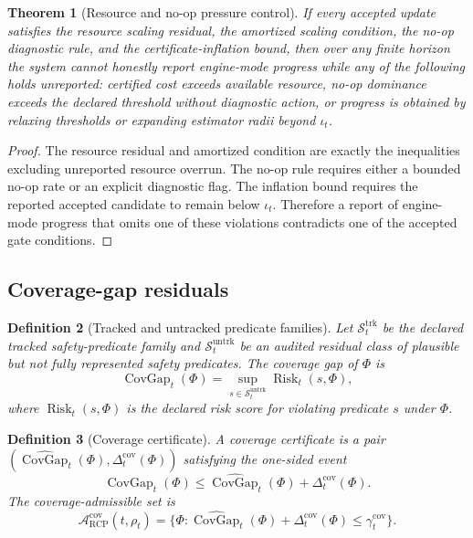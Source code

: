 \documentclass[11pt]{article}
\newtheorem{theorem}{Theorem}[section]
\newtheorem{definition}[theorem]{Definition}
\newcommand{\Acal}{\mathcal{A}}
\newcommand{\1}{\mathbf{1}}
\newcommand{\RCP}{\mathrm{RCP}}
\newcommand{\Risk}{\operatorname{Risk}}
\providecommand{\Scal}{\mathcal{S}}
\begin{document}
\begin{theorem}[Resource and no-op pressure control]
\label{thm:resource_noop_pressure_control_operational}
If every accepted update satisfies the resource scaling residual, the amortized scaling condition, the no-op diagnostic rule, and the certificate-inflation bound, then over any finite horizon the system cannot honestly report engine-mode progress while any of the following holds unreported: certified cost exceeds available resource, no-op dominance exceeds the declared threshold without diagnostic action, or progress is obtained by relaxing thresholds or expanding estimator radii beyond \(\iota_t\).
\end{theorem}

\begin{proof}
The resource residual and amortized condition are exactly the inequalities excluding unreported resource overrun.  The no-op rule requires either a bounded no-op rate or an explicit diagnostic flag.  The inflation bound requires the reported accepted candidate to remain below \(\iota_t\).  Therefore a report of engine-mode progress that omits one of these violations contradicts one of the accepted gate conditions.
\end{proof}

\subsection{Coverage-gap residuals}

\begin{definition}[Tracked and untracked predicate families]
\label{def:tracked_untracked_predicate_families}
Let \(\Scal_t^{\mathrm{trk}}\) be the declared tracked safety-predicate family and \(\Scal_t^{\mathrm{untrk}}\) be an audited residual class of plausible but not fully represented safety predicates.  The coverage gap of \(\Phi\) is
\[
\operatorname{CovGap}_t(\Phi)
=
\sup_{s\in\Scal_t^{\mathrm{untrk}}}\Risk_t(s,\Phi),
\]
where \(\Risk_t(s,\Phi)\) is the declared risk score for violating predicate \(s\) under \(\Phi\).
\end{definition}

\begin{definition}[Coverage certificate]
\label{def:coverage_certificate_operational}
A coverage certificate is a pair \((\widehat{\operatorname{CovGap}}_t(\Phi),\Delta_t^{\mathrm{cov}}(\Phi))\) satisfying the one-sided event
\[
\operatorname{CovGap}_t(\Phi)
\le
\widehat{\operatorname{CovGap}}_t(\Phi)+\Delta_t^{\mathrm{cov}}(\Phi).
\]
The coverage-admissible set is
\[
\Acal_{\RCP}^{\mathrm{cov}}(t,\rho_t)
=
\{\Phi:\widehat{\operatorname{CovGap}}_t(\Phi)+\Delta_t^{\mathrm{cov}}(\Phi)\le\gamma_t^{\mathrm{cov}}\}.
\]
\end{definition}
\end{document}
